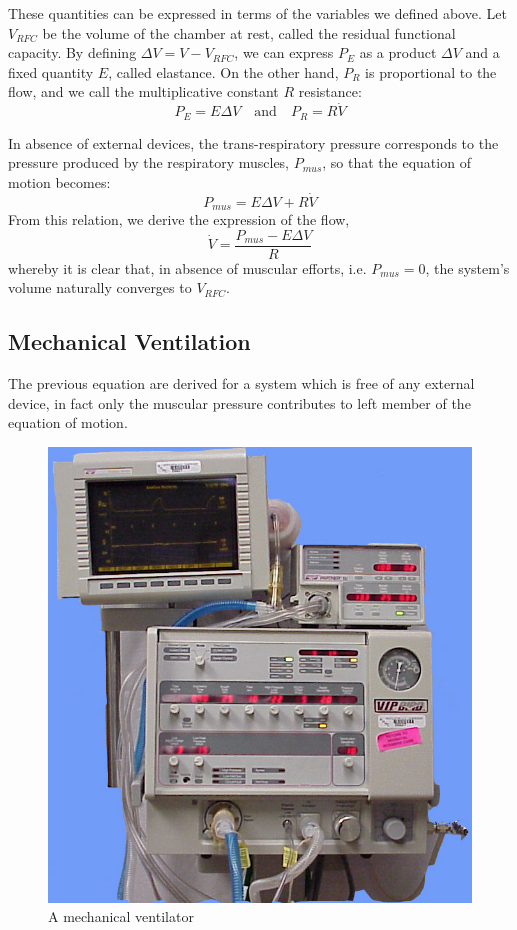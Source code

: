 \documentclass[a4paper, twoside]{article}
\begin{document}
     These quantities can be expressed in terms of the variables we defined above. Let $V_{RFC}$ be the volume of the chamber at rest, called the residual functional capacity. By defining $\Delta V = V - V_{RFC}$, we can express $P_E$ as a product $\Delta V$ and a fixed quantity $E$, called elastance. On the other hand, $P_R$ is proportional to the flow, and we call the multiplicative constant $R$ resistance:
     $$ P_E = E\Delta V \quad \textrm{and} \quad P_R = R\dot{V} $$

     In absence of external devices, the trans-respiratory pressure corresponds to the pressure produced by the respiratory muscles, $P_{mus}$, so that the equation of motion becomes:
     $$ P_{mus} = E\Delta V + R\dot{V} $$
     From this relation, we derive the expression of the flow,
     $$ \dot{V} = \frac{P_{mus}-E\Delta V}{R}$$
     whereby it is clear that, in absence of muscular efforts, i.e. $P_{mus}=0$, the system's volume naturally converges to $V_{RFC}$.

    \subsection{Mechanical Ventilation}
    The previous equation are derived for a system which is free of any external device, in fact only the muscular pressure contributes to left member of the equation of motion.

    \begin{figure}
        \includegraphics[width=1\linewidth]{mechanicalventilator.jpg}
        \caption{A mechanical ventilator}
        \label{fig:mecvent}
    \end{figure}
\end{document}
